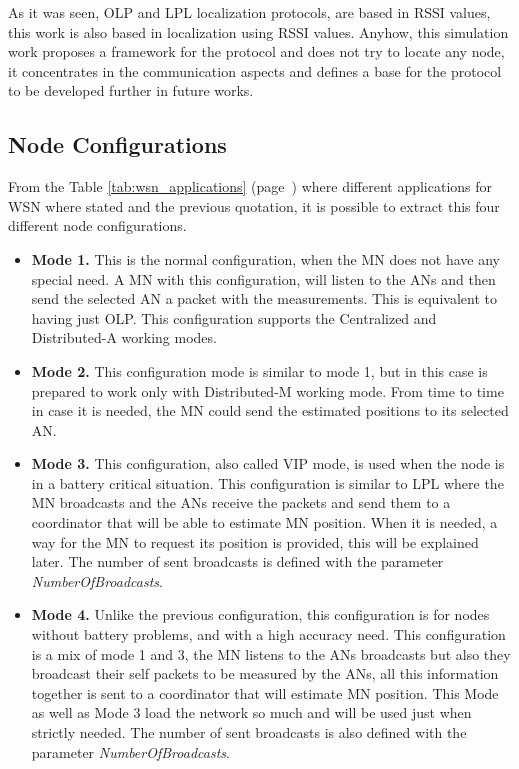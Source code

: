 As it was seen, \ac{OLP} and \ac{LPL} localization protocols, are based in \ac{RSSI} values, this work is also based in localization using 
\ac{RSSI} values. Anyhow, this simulation work proposes a framework for the protocol and does not try to locate any node, it concentrates
in the communication aspects and defines a base for the protocol to be developed further in future works.


\subsection{Node Configurations}

From the Table \ref{tab:wsn_applications} (page~\pageref{tab:wsn_applications}) where different applications for \ac{WSN} where stated and the
previous quotation, it is possible to extract this four different node configurations.

\begin{itemize}
 \item \textbf{Mode 1.} This is the normal configuration, when the \ac{MN} does not have any special need. A \ac{MN} with this configuration,
will listen to the \acp{AN} and then send the selected \ac{AN} a packet with the measurements. This is equivalent to having just \ac{OLP}. This
configuration supports the Centralized and Distributed-A working modes.
 \item \textbf{Mode 2.} This configuration mode is similar to mode 1, but in this case is prepared to work only with Distributed-M working mode.
From time to time in case it is needed, the \ac{MN} could send the estimated positions to its selected \ac{AN}.
 \item \textbf{Mode 3.} This configuration, also called \ac{VIP} mode, is used when the node is in a battery critical situation.
This configuration is similar to \ac{LPL} where the \ac{MN} broadcasts and the \acp{AN} receive the packets and send them to a coordinator that
will be able to estimate \ac{MN} position. When it is needed, a way for the \ac{MN} to request its position is provided, this will be explained 
later. The number of sent broadcasts is defined with the parameter \textit{NumberOfBroadcasts}.
 \item \textbf{Mode 4.} Unlike the previous configuration, this configuration is for nodes without battery problems, and with a high accuracy
need. This configuration is a mix of mode 1 and 3, the \ac{MN} listens to the \acp{AN} broadcasts but also they broadcast their
self packets to be measured by the \acp{AN}, all this information together is sent to a coordinator that will estimate \ac{MN} position.
This Mode as well as Mode 3 load the network so much and will be used just when strictly needed. The number of sent broadcasts is also defined with 
the parameter \textit{NumberOfBroadcasts}.
\end{itemize}

